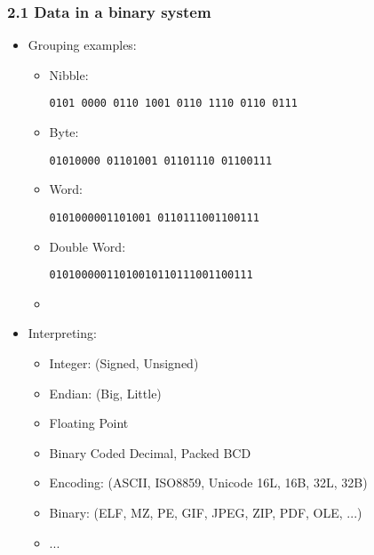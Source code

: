 \begin{frame}[fragile]
  \frametitle{2.1 Data in a binary system}
    \begin{itemize}
        \item Grouping examples:
        \begin{itemize}
	    \item Nibble:\begin{footnotesize} \texttt{0101 0000 0110 1001 0110 1110 0110 0111} \end{footnotesize} 
            \item Byte:\begin{footnotesize} \texttt{01010000 01101001 01101110 01100111} \end{footnotesize}
            \item Word:\begin{footnotesize} \texttt{0101000001101001 0110111001100111} \end{footnotesize}
            \item Double Word:\begin{footnotesize} \texttt{01010000011010010110111001100111} \end{footnotesize}
	    \item[]
        \end{itemize}
        \item Interpreting:
        \begin{itemize}
	    \item Integer: (Signed, Unsigned)
	    \item Endian: (Big, Little)
            \item Floating Point
            \item Binary Coded Decimal, Packed BCD
	    \item Encoding: (ASCII, ISO8859, Unicode 16L, 16B, 32L, 32B)
	    \item Binary: (ELF, MZ, PE, GIF, JPEG, ZIP, PDF, OLE, ...)
            \item ...
        \end{itemize}
    \end{itemize}
\end{frame}


